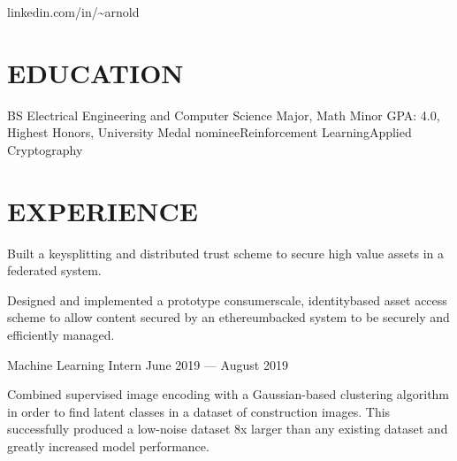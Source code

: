 \documentclass[10pt]{article}
\begin{document}
				 {linkedin.com/in/{\textasciitilde}arnold}      

\section*{EDUCATION}

    {BS {\textendash} Electrical Engineering and Computer Science Major, Math Minor}
{GPA: 4.0, Highest Honors, University Medal nominee}{Reinforcement Learning}{Applied Cryptography}


\section*{EXPERIENCE}


                  \begin{accomplishments}
                \item Built a key{\textendash}splitting and distributed trust scheme to secure high value assets in a federated system.
                \item Designed and implemented a prototype consumer{\textendash}scale, identity{\textendash}based asset access scheme to allow content secured by an ethereum{\textendash}backed system to be securely and efficiently managed. 
                  \end{accomplishments}

                {Machine Learning Intern}
                {June 2019 --- August 2019}
                    \begin{accomplishments}
                        \item Combined supervised image encoding with a Gaussian-based clustering algorithm in order to find latent classes in a dataset of construction images. 
                          This successfully produced a low-noise dataset 8x larger than any existing dataset and greatly increased model performance.
                    \end{accomplishments}
\end{document}
